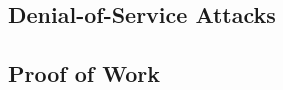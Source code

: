 \subsection{Denial-of-Service Attacks}
\begin{comment}
\label{text:dos}
DoS attacks continues to plague internet services even if they are efficaciously protected against intrusive security breaches, as evidenced by the recent attack on Spamhaus \cite{BBC}. A denial of service attack is essentially a targeted effort to prevent a service from servicing legitimate requests by draining the underlying computer resources.Such an attack is executed by having each attacking machine performing only small load of the total work, relying on the cumulative work to overload the target system. 
\\
\\
The typical DoS attack exploits the server by generating excessive memory and/or CPU utilisation of the server. Popular examples include SYN spoofing attacks which triggers the server to allocate input buffers for connections that never complete initiation as well as SSL attacks in which the server CPU is overloaded with expensive public-key decryption calculations. 
\end{comment}

\subsection{Proof of Work}





